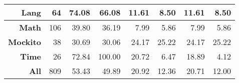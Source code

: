 \begin{table}[h!]
{\begin{tabular}{|r|r|rr|rr|rr|}
            \textbf{Lang}                           & 64                                     & \multicolumn{1}{r|}{74.08} & 66.08                 & \multicolumn{1}{r|}{11.61} & 8.50                  & \multicolumn{1}{r|}{11.61} & 8.50                  \\ \hline
            \textbf{Math}                           & 106                                    & \multicolumn{1}{r|}{39.80} & 36.19                 & \multicolumn{1}{r|}{7.99}  & 5.86                  & \multicolumn{1}{r|}{7.99}  & 5.86                  \\ \hline
            \textbf{Mockito}                        & 38                                     & \multicolumn{1}{r|}{30.69} & 30.06                 & \multicolumn{1}{r|}{24.17} & 25.22                 & \multicolumn{1}{r|}{24.17} & 25.22                 \\ \hline
            \textbf{Time}                           & 26                                     & \multicolumn{1}{r|}{72.84} & 100.00                & \multicolumn{1}{r|}{20.72} & 6.47                  & \multicolumn{1}{r|}{18.89} & 4.12                  \\ \hline
            \hline
            \textbf{All}                            & 809                                    & \multicolumn{1}{r|}{53.43} & 49.89                 & \multicolumn{1}{r|}{20.92} & 12.36                 & \multicolumn{1}{r|}{20.71} & 12.00                 \\ \hline
        \end{tabular}
    }
    \vspace{-4mm}
\end{table}
